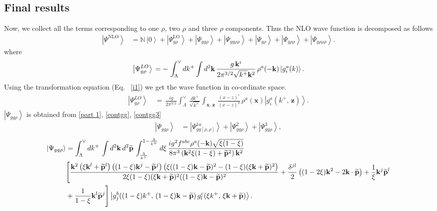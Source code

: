 \documentclass[10pt]{article}
\def\mf#1{\mathbb{#1}}
\numberwithin{equation}{section}
\begin{document}
 \subsection{Final results}
Now, we collect all the terms corresponding to one $\rho$, two $\rho$ and three $\rho$ components. Thus the NLO wave function is decomposed as follows
\begin{align}\label{NLOWF}
\left|\Psi^{\text{NLO}}\right\rangle & = \mf{N}\,\left|0\right\rangle +\left|\Psi_{g\rho}^{\text{LO}}\right\rangle  
+\left|\Psi_{gg\rho}\right\rangle +\left|\Psi_{gg\rho\rho}\right\rangle +\left|\Psi_{g\rho}\right\rangle +\left|\Psi_{g\rho\rho}\right\rangle +
\left|\Psi_{g\rho\rho\rho}\right\rangle .
\end{align}
where
\begin{equation}\label{lowav1mom}
\left|\Psi_{g\rho}^{LO}\right\rangle \,=\- -\,\int_{\Lambda}^{\vee}dk^{+}\int d^{2}\mathbf{k}\,\frac{g\, \mathbf{k}^{i}}{2\pi^{3/2}\sqrt{k^{+}}\mathbf{k}^{2}}\,\rho^{a}(-\mathbf{k})\left|g_{i}^{a}(k)\right\rangle .
\end{equation}
Using the transformation equation (Eq.~ \eqref{i1}) we get the wave function in co-ordinate space.
\begin{align}\label{lowav1}
\left|\Psi_{g\rho}^{LO}\right\rangle \,& =\,\frac{ig}{2\pi^{3/2}}\int_{\Lambda}^{\vee}\,\frac{dk^{+}}{\sqrt{k^{+}}}\int_{\mathbf{x},\, \mathbf{z}}\,\frac{ (x-z)^{i}}{(x-z)^{2}}\,\rho^{a}(\mathbf{x})\left|g_{i}^{a}(k^{+},\, \mathbf{z})\right\rangle .
 \end{align}
$\left|\Psi_{gg\rho}\right\rangle$ is obtained from \eqref{part 1}, \eqref{contgg}, \eqref{contgg3}
\begin{align}
    \left|\Psi_{gg\rho}\right\rangle  & = \left|\Psi^{1a}_{gg[\rho,\rho]}\right\rangle + \left|\Psi^{2}_{gg\rho}\right\rangle + \left|\Psi^{3}_{gg\rho}\right\rangle,
\end{align}
\begin{align}\label{psiggrhomom}
    \left|\Psi_{gg\rho}\right\rangle  & = \int_{\Lambda}^{\vee}dk^{+}\,\int d^{2}\mathbf{k}\, d^{2}\widetilde{\mathbf{p}}\,\int_{\frac{\Lambda}{k^{+}}}^{1-\frac{\Lambda}{k^{+}}}d\xi\,\frac{ig^{2}f^{abc}\rho^{a}(-\mathbf{k})\sqrt{\xi(1-\xi)}}{8\pi^{3}\left(\mathbf{k}^{2}\xi(1-\xi)+\widetilde{\mathbf{p}}^{2}\right)\mathbf{k}^{2}}\notag \\
&\Bigg[\frac{\mathbf{k}^{2}\left(\xi \mathbf{k}^{l}+\widetilde{\mathbf{p}}^{l}\right)\left((1-\xi)\mathbf{k}^{j}-\widetilde{\mathbf{p}}^{j}\right)\left(\xi((1-\xi)\mathbf{k}-\widetilde{\mathbf{p}})^{2}-(1-\xi)(\xi \mathbf{k}+\widetilde{\mathbf{p}})^{2}\right)}{2\xi(1-\xi)(\xi \mathbf{k}+\widetilde{\mathbf{p}})^{2}((1-\xi)\mathbf{k}-\widetilde{\mathbf{p}})^{2}}+\frac{\delta^{jl}}{2}\left((1-2\xi)\mathbf{k}^{2}-2\mathbf{k}\cdot\widetilde{\mathbf{p}}\right)+\frac{1}{\xi}\mathbf{k}^{j}\widetilde{\mathbf{p}}^{l}\notag \\ & +\frac{1}{1-\xi}\mathbf{k}^{l}\widetilde{\mathbf{p}}^{j}\Bigg] \left|g_{j}^{b}((1-\xi)k^{+},\,(1-\xi)\mathbf{k}-\widetilde{\mathbf{p}})\, g_{l}^{c}(\xi k^{+},\,\xi\mathbf{k}+\widetilde{\mathbf{p}})\right\rangle.
\end{align}
\end{document}
